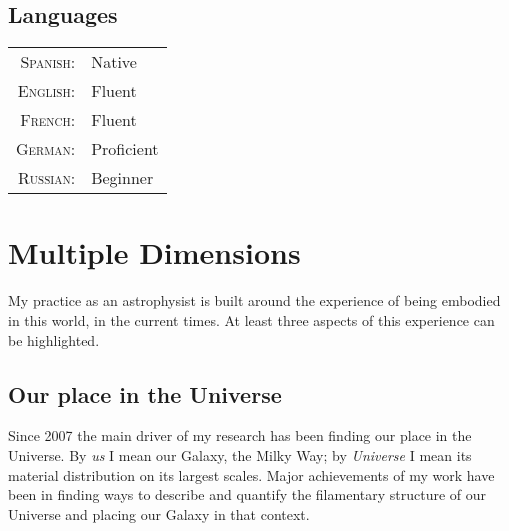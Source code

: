 \documentclass[a4paper,10pt]{article} %
\begin{document}


\subsection{Languages}

\begin{tabular}{rl}
\textsc{Spanish:} & Native\\
\textsc{English:} & Fluent\\
\textsc{French:} & Fluent \\
\textsc{German:} & Proficient \\
\textsc{Russian:} & Beginner \\
\end{tabular}

\color{red}
\section{Multiple Dimensions}
\color{black}

My practice as an astrophysist is built around the experience of being
embodied in this world, in the current times.  
At least three aspects
of this experience can be highlighted.



\subsection{Our place in the Universe}

Since 2007 the main driver of my research has been finding our place
in the Universe. By \emph{us} I mean our Galaxy, the Milky Way; by
\emph{Universe} I mean its material distribution on its largest scales.
Major achievements of my work have been in finding ways to describe and
quantify the filamentary structure of our Universe 
and placing our Galaxy in that context. 
\end{document}
